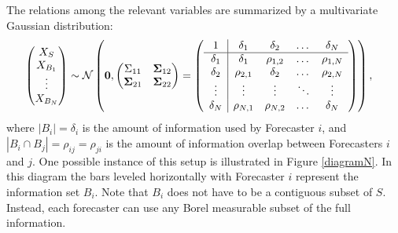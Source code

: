 \documentclass[12pt]{article}
\theoremstyle{definition}
\theoremstyle{definition}
\begin{document}
The relations among the relevant variables are summarized by a multivariate Gaussian distribution:
\begin{align}
\left(\begin{matrix} X_S \\ X_{B_1}\\ \vdots \\ X_{B_N} \end{matrix}\right) &\sim \mathcal{N}\left( 
 \boldsymbol{0}, \left(\begin{matrix} 
\Sigma_{11} & {\bf \Sigma}_{12}\\
{\bf\Sigma}_{21} & {\bf \Sigma}_{22}\\
 \end{matrix}\right) 
 =
 \left(\begin{array}{c | c c cc }
1 & \delta_1 & \delta_2 & \dots & \delta_N  \\ \hline
\delta_1 & \delta_1 &\rho_{1,2} & \dots & \rho_{1,N}   \\ 
\delta_2 & \rho_{2,1} & \delta_2 & \dots & \rho_{2,N}  \\ 
\vdots & \vdots & \vdots & \ddots & \vdots  \\ 
\delta_N & \rho_{N,1} & \rho_{N,2} & \dots & \delta_N\\ 
 \end{array}\right)\right),  \label{Nforecasters}
\end{align}
where $|B_i| = \delta_i$ is the amount of information used by Forecaster $i$, and $|B_i \cap B_j| = \rho_{ij} = \rho_{ji}$ is the amount of information overlap between Forecasters $i$ and $j$. One possible instance of this setup is illustrated in Figure \ref{diagramN}. In this diagram the bars leveled horizontally with Forecaster $i$ represent the information set $B_i$. Note that $B_i$ does not have to be a contiguous subset of $S$.  Instead, each forecaster can use any Borel measurable
subset of the full information. 
\end{document}
